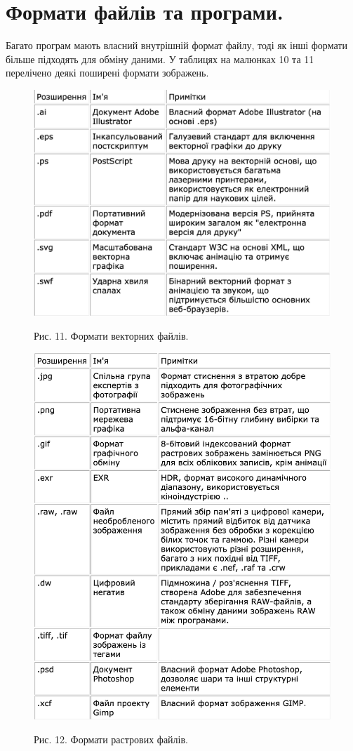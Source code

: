 \documentclass[11pt]{article}
\begin{document}
    \section{Формати файлів та програми.}\label{sec:image_formats}
    Багато програм мають власний внутрішній формат файлу, тоді як інші формати більше підходять для обміну даними.
    У таблицях на малюнках 10 та 11 перелічено деякі поширені формати зображень.

    \begin{figure}
        \label{fig:image11}
        \centering
        \includegraphics[scale=0.5]{image11.png}

        Рис. 11. Формати векторних файлів.
    \end{figure}

    \begin{figure}
        \label{fig:image12}
        \centering
        \includegraphics[scale=0.5]{image12.png}

        Рис. 12. Формати растрових файлів.
    \end{figure}
\end{document}
